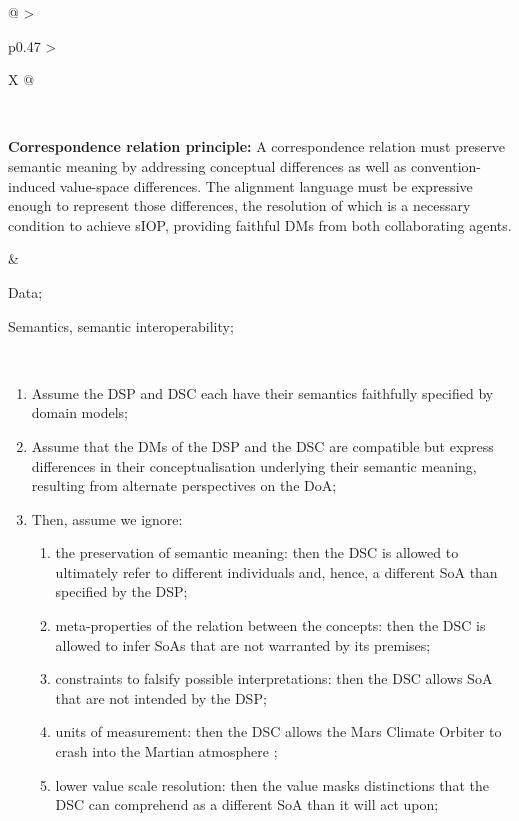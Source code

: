 \begin{xltabular}[l]{\linewidth}{@{} >{\small\raggedright\arraybackslash}p{0.47\linewidth} >{\small\raggedright\arraybackslash}X @{}}
\begin{enumerate}[left=10pt, nosep]
\end{enumerate} \\
%
%
%
\begin{mmdp}\label{dp:alignment-language}{\bfseries Correspondence relation principle:}
\quad A correspondence relation must preserve semantic meaning by addressing conceptual differences as well as convention-induced value-space differences. The alignment language must be expressive enough to represent those differences, the resolution of which is a necessary condition to achieve sIOP, providing faithful DMs from both collaborating agents. \end{mmdp}
&
\begin{description}[labelwidth=3.7cm,leftmargin=3.7cm+1ex,nosep,topsep=2ex,labelsep=1ex,font=\bfseries]
  \item[Type of information:] Data;
  \item[Quality attributes:] Semantics, semantic interoperability;
\end{description}\\
\begin{enumerate}[left=6pt, nosep]
  \item Assume the DSP and DSC each have their semantics faithfully specified by domain models;
  \item Assume that the DMs of the DSP and the DSC are compatible but express differences in their conceptualisation underlying their semantic meaning, resulting from alternate perspectives on the DoA;
  \item Then, assume we ignore:
  \begin{enumerate}
    \item the preservation of semantic meaning: then the DSC is allowed to ultimately refer to different individuals and, hence, a different SoA than specified by the DSP; 
    \item meta-properties of the relation between the concepts: then the DSC is allowed to infer SoAs that are not warranted by its premises;
    \item constraints to falsify possible interpretations: then the DSC allows SoA that are not intended by the DSP; 
    \item units of measurement: then the DSC allows the Mars Climate Orbiter to crash into the Martian atmosphere \cite{Leveson2004};
    \item lower value scale resolution: then the value masks distinctions that the DSC can comprehend as a different SoA than it will act upon;

\end{enumerate}
\end{enumerate}
\end{xltabular}
